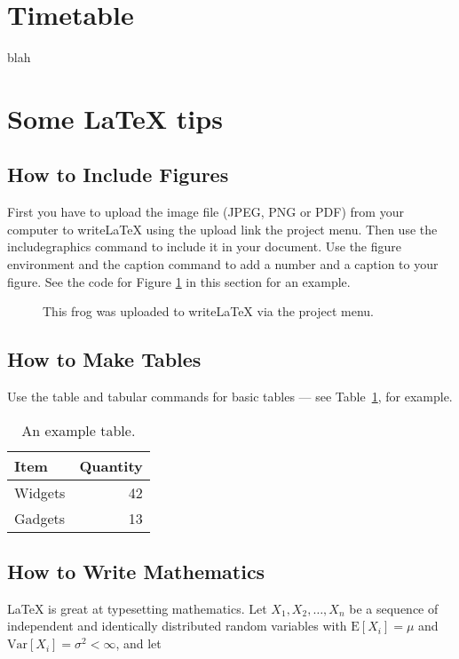 \documentclass[a4paper]{article}
\begin{document}
\section{Timetable}
blah

\section{Some LaTeX tips}
\label{sec:latex}
\subsection{How to Include Figures}

First you have to upload the image file (JPEG, PNG or PDF) from your computer to writeLaTeX using the upload link the project menu. Then use the includegraphics command to include it in your document. Use the figure environment and the caption command to add a number and a caption to your figure. See the code for Figure \ref{fig:frog} in this section for an example.

\begin{figure}
	\centering
	\caption{\label{fig:frog}This frog was uploaded to writeLaTeX via the project menu.}
\end{figure}

\subsection{How to Make Tables}

Use the table and tabular commands for basic tables --- see Table~\ref{tab:widgets}, for example.

\begin{table}
	\centering
	\begin{tabular}{l|r}
		Item    & Quantity \\\hline
		Widgets & 42       \\
		Gadgets & 13
	\end{tabular}
	\caption{\label{tab:widgets}An example table.}
\end{table}

\subsection{How to Write Mathematics}

\LaTeX{} is great at typesetting mathematics. Let $X_1, X_2, \ldots, X_n$ be a sequence of independent and identically distributed random variables with $\text{E}[X_i] = \mu$ and $\text{Var}[X_i] = \sigma^2 < \infty$, and let
\end{document}
